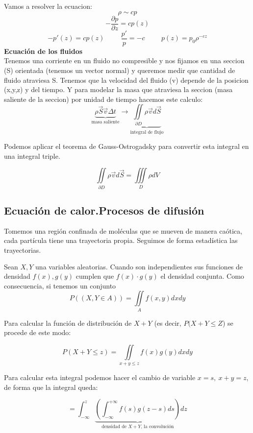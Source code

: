 \documentclass[openany]{book}
\begin{document}
Vamos a resolver la ecuacion:
$$ \rho \sim cp $$
$$ - \dfrac{\partial p}{\partial z} = cp(z) $$
$$ -p'(z)=cp(z) \hspace{1cm} \dfrac{p'}{p} = -c \hspace{1cm} p(z) = p_0 \rho ^{-cz} $$
$  $\\

\textbf{Ecuación de los fluidos}\\
Tenemos una corriente en un fluido no compresible y nos fijamos en una seccion (S) orientada (tenemos un vector normal) y queremos medir que cantidad de fluido atraviesa S. Tenemos que la velocidad del fluido (v) depende de la posicion (x,y,z) y del tiempo. Y para modelar la masa que atraviesa la seccion (masa saliente de la seccion) por unidad de tiempo hacemos este calculo:
$$ \underbrace{\rho \overrightarrow{S} \overrightarrow{v}\Delta t }_{\text{masa saliente}} \to \underbrace{\iint\limits_{\partial D} \rho \overrightarrow{v}d \overrightarrow{S}}_{\text{integral de flujo}} $$

Podemos aplicar el teorema de Gauss-Ostrogadsky para convertir esta integral en una integral triple.

$$ \iint\limits_{\partial D}\rho \overrightarrow{v}d \overrightarrow{S} = \iiint\limits_D \rho dV  $$

\subsection{Ecuación de calor.Procesos de difusión}

Tomemos una región confinada de moléculas que se mueven de manera caótica, cada partícula tiene una trayectoria propia. Seguimos de forma estadística las trayectorias.

Sean $ X,Y $ una variables aleatorias. Cuando son independientes sus funciones de densidad $ f(x),g(y) $ cumplen que $ f(x)\cdot g(y) $ el densidad conjunta.
Como consecuencia, si tenemos un conjunto
$$P((X,Y \in A)) = \iint\limits_A f(x,y) dxdy $$

Para calcular la función de distribución de $ X+Y $ (es decir, $P(X+Y \leq Z$) se procede de este modo:

$$ P (X+Y \leq z) = \iint\limits_{x+y \leq  z} f(x)g(y)dxdy $$

Para calcular esta integral podemos hacer el cambio de variable $ x=s,\ x+y=z $, de forma que la integral queda:

$$ = \int_{-\infty}^{z}\underbrace{ \left(\int_{-\infty}^{+\infty}f(s)g(z-s)ds \right) }_{ \text{densidad de }X+Y\text{, la convolución} } dz $$
\end{document}
